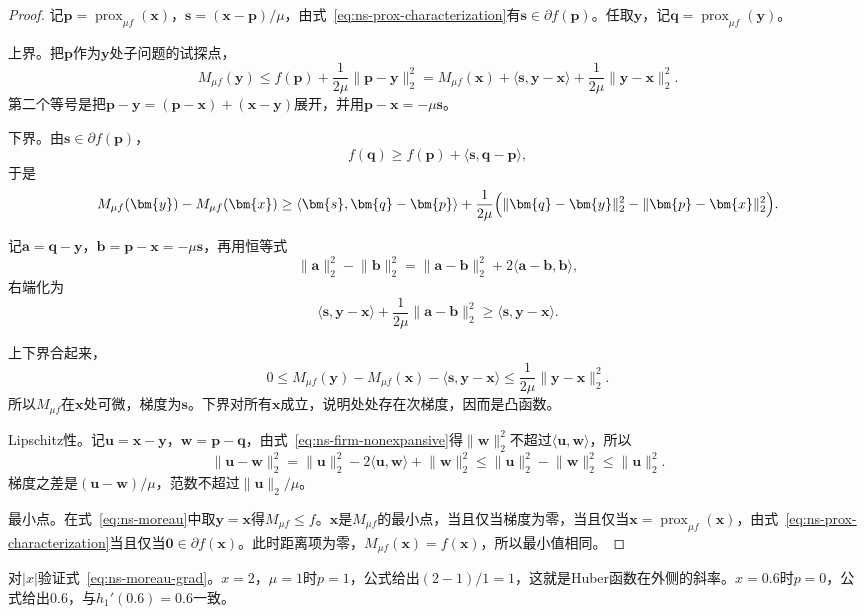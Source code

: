 \begin{proof}
记$\bm{p}=\operatorname{prox}_{\mu f}(\bm{x})$，$\bm{s}=(\bm{x}-\bm{p})/\mu$，由式~\eqref{eq:ns-prox-characterization}有$\bm{s}\in\partial f(\bm{p})$。任取$\bm{y}$，记$\bm{q}=\operatorname{prox}_{\mu f}(\bm{y})$。

上界。把$\bm{p}$作为$\bm{y}$处子问题的试探点，
\[
 M_{\mu f}(\bm{y})\leq f(\bm{p})+\frac{1}{2\mu}\lVert\bm{p}-\bm{y}\rVert_2^2=M_{\mu f}(\bm{x})+\langle\bm{s},\bm{y}-\bm{x}\rangle+\frac{1}{2\mu}\lVert\bm{y}-\bm{x}\rVert_2^2.
\]
第二个等号是把$\bm{p}-\bm{y}=(\bm{p}-\bm{x})+(\bm{x}-\bm{y})$展开，并用$\bm{p}-\bm{x}=-\mu\bm{s}$。

下界。由$\bm{s}\in\partial f(\bm{p})$，
\[
 f(\bm{q})\geq f(\bm{p})+\langle\bm{s},\bm{q}-\bm{p}\rangle,
\]
于是
\[
 M_{\mu f}(\bm{y})-M_{\mu f}(\bm{x})\geq\langle\bm{s},\bm{q}-\bm{p}\rangle+\frac{1}{2\mu}\Bigl(\lVert\bm{q}-\bm{y}\rVert_2^2-\lVert\bm{p}-\bm{x}\rVert_2^2\Bigr).
\]

记$\bm{a}=\bm{q}-\bm{y}$，$\bm{b}=\bm{p}-\bm{x}=-\mu\bm{s}$，再用恒等式
\[
 \lVert\bm{a}\rVert_2^2-\lVert\bm{b}\rVert_2^2=\lVert\bm{a}-\bm{b}\rVert_2^2+2\langle\bm{a}-\bm{b},\bm{b}\rangle,
\]
右端化为
\[
 \langle\bm{s},\bm{y}-\bm{x}\rangle+\frac{1}{2\mu}\lVert\bm{a}-\bm{b}\rVert_2^2\geq\langle\bm{s},\bm{y}-\bm{x}\rangle.
\]

上下界合起来，
\[
 0\leq M_{\mu f}(\bm{y})-M_{\mu f}(\bm{x})-\langle\bm{s},\bm{y}-\bm{x}\rangle\leq\frac{1}{2\mu}\lVert\bm{y}-\bm{x}\rVert_2^2.
\]
所以$M_{\mu f}$在$\bm{x}$处可微，梯度为$\bm{s}$。下界对所有$\bm{x}$成立，说明处处存在次梯度，因而是凸函数。

Lipschitz性。记$\bm{u}=\bm{x}-\bm{y}$，$\bm{w}=\bm{p}-\bm{q}$，由式~\eqref{eq:ns-firm-nonexpansive}得$\lVert\bm{w}\rVert_2^2$不超过$\langle\bm{u},\bm{w}\rangle$，所以
\[
 \lVert\bm{u}-\bm{w}\rVert_2^2=\lVert\bm{u}\rVert_2^2-2\langle\bm{u},\bm{w}\rangle+\lVert\bm{w}\rVert_2^2\leq\lVert\bm{u}\rVert_2^2-\lVert\bm{w}\rVert_2^2\leq\lVert\bm{u}\rVert_2^2.
\]
梯度之差是$(\bm{u}-\bm{w})/\mu$，范数不超过$\lVert\bm{u}\rVert_2/\mu$。

最小点。在式~\eqref{eq:ns-moreau}中取$\bm{y}=\bm{x}$得$M_{\mu f}\leq f$。$\bm{x}$是$M_{\mu f}$的最小点，当且仅当梯度为零，当且仅当$\bm{x}=\operatorname{prox}_{\mu f}(\bm{x})$，由式~\eqref{eq:ns-prox-characterization}当且仅当$\bm{0}\in\partial f(\bm{x})$。此时距离项为零，$M_{\mu f}(\bm{x})=f(\bm{x})$，所以最小值相同。
\end{proof}

对$\lvert x\rvert$验证式~\eqref{eq:ns-moreau-grad}。$x=2$，$\mu=1$时$p=1$，公式给出$(2-1)/1=1$，这就是Huber函数在外侧的斜率。$x=0.6$时$p=0$，公式给出$0.6$，与$h_1'(0.6)=0.6$一致。

